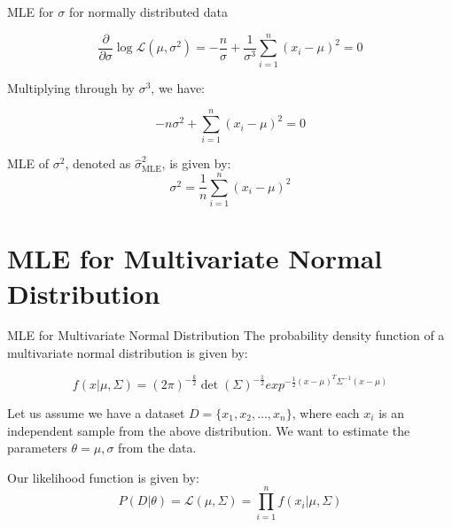\documentclass[handout]{beamer}
\begin{document}
\begin{frame}{MLE for $\sigma$ for normally distributed data}

    
        \[
        \frac{{\partial}}{{\partial \sigma}} \log \mathcal{L}(\mu, \sigma^2) = -\frac{n}{\sigma} + \frac{1}{\sigma^3} \sum_{i=1}^n (x_i-\mu)^2 = 0
        \]
    
        Multiplying through by $\sigma^3$, we have:
    
        \[
        -n \sigma^2 + \sum_{i=1}^n (x_i-\mu)^2 = 0
        \]
    
        \begin{tcolorbox}[colback=metropolisblue!5,colframe=metropolisblue,title=Maximum Likelihood Estimate for $\sigma^2$]
            MLE of $\sigma^2$, denoted as $\hat{\sigma}^2_{\text{MLE}}$, is given by:
            \[
                \sigma^2 = \frac{1}{n} \sum_{i=1}^n (x_i-\mu)^2
                \]
        \end{tcolorbox}
    
       

    \end{frame}

\section{MLE for Multivariate Normal Distribution}
\begin{frame}{MLE for Multivariate Normal Distribution}
The probability density function of a multivariate normal distribution is given by:

\begin{equation}
f(x|\mu, \Sigma) = (2\pi)^{-\frac{k}{2}}\det(\Sigma)^{-\frac{1}{2}}exp^{-\frac{1}{2}(x-\mu)^{T}\Sigma^{-1}(x-\mu)}
\end{equation}
\end{frame}
\begin{frame}
Let us assume we have a dataset $D = \{x_1, x_2, \ldots, x_n\}$, where each $x_i$ is an independent sample from the above distribution.
We want to estimate the parameters $\theta = {\mu, \sigma}$ from the data.

Our likelihood function is given by:
\begin{equation}
P(D|\theta) = \mathcal{L}(\mu, \Sigma) = \prod_{i=1}^n f(x_i|\mu, \Sigma)
\end{equation}

\end{frame}
\end{document}
